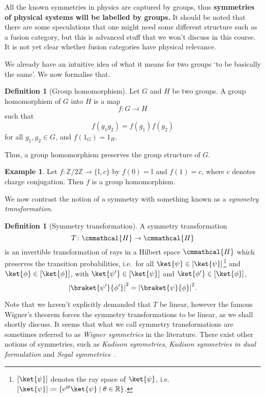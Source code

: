 \documentclass[a4 paper, 12pt]{book}
\renewcommand{\mathcal}{\cmmathcal}
\theoremstyle{definition}
\newtheorem{definition}[theorem]{Definition}
\newtheorem{example}[theorem]{Example}
\newcommand{\rr}{\mathbb{R}}
\newcommand{\ii}{\mathbb{I}}
\newcommand{\zz}{\mathbb{Z}}
\renewcommand{\i}{\mathrm{i}}
\newcommand{\e}{\mathrm{e}}
\DeclarePairedDelimiter{\abs}{\lvert}{\rvert}
\newcommand{\hilbert}{\mathcal{H}}
\begin{document}
	All the known symmetries in physics are captured by groups, thus \textbf{symmetries of physical systems will be labelled by groups.} It should be noted that there are some speculations that one might need some different structure such as a fusion category, but this is advanced stuff that we won't discuss in this course. It is not yet clear whether fusion categories have physical relevance.

	We already have an intuitive idea of what it means for two groups `to be basically the same'. We now formalise that.
	\begin{definition}[Group homomorphism]
	    Let \(G\) and \(H\) be two groups. A group homomorphism of \(G\) into \(H\) is a map
		\begin{equation*}
			f \colon G \rightarrow H
		\end{equation*}
		such that
		\begin{equation*}
			f(g_1 g_2) = f(g_1) f(g_2)
		\end{equation*}
		for all \(g_1, g_2 \in G\), and \(f(1_G) = 1_H\).
	\end{definition}
	\noindent Thus, a group homomorphism preserves the group structure of \(G\).

	\begin{example}
		Let \(f \colon \zz/2\zz \rightarrow \{\ii, c\}\) by \(f(0) = \ii\) and \(f(1) = c\), where \(c\) denotes charge conjugation. Then \(f\) is a group homomorphism.
	\end{example}

	We now contrast the notion of a symmetry with something known as a \textit{symmetry transformation}.
	\begin{definition}[Symmetry transformation]
		A symmetry transformation
		\begin{equation*}
			T \colon \hilbert \rightarrow \hilbert
		\end{equation*}
		is an invertible transformation of rays in a Hilbert space \(\hilbert\) which preserves the transition probabilities, i.e.\ for all \(\ket{\psi} \in [\ket{\psi}]\)\footnote{\([\ket{\psi}]\) denotes the ray space of \(\ket{\psi}\), i.e.\ \([\ket{\psi}] \coloneq \{\e^{\i\theta}\ket{\psi} \mid \theta\in\rr\}\).} and \(\ket{\phi} \in [\ket{\phi}]\), with \(\ket{\psi'} \in [\ket{\psi}]\) and \(\ket{\phi'} \in [\ket{\phi}]\),
		\begin{equation*}
			{\abs{\braket{\psi'}{\phi'}}}^2 = {\abs{\braket{\psi}{\phi}}}^2.
		\end{equation*}
	\end{definition}
	\noindent Note that we haven't explicitly demanded that \(T\) be linear, however the famous Wigner's theorem forces the symmetry transformations to be linear, as we shall shortly discuss. It seems that what we call symmetry transformations are sometimes referred to as \textit{Wigner symmetries} in the literature. There exist other notions of symmetries, such as \textit{Kadison symmetries}, \textit{Kadison symmetries in dual formulation} and \textit{Segal symmetries}~\cite{Moretti_symmetry_definition}\cite[chp.~12]{Moretti}.
\end{document}
